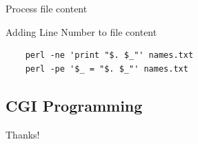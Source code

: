 \documentclass[UTF8]{beamer}
\begin{document}
\begin{frame}[fragile]{Process file content}
\begin{block}{Adding Line Number to file content}
  \begin{verbatim}
    perl -ne 'print "$. $_"' names.txt
    perl -pe '$_ = "$. $_"' names.txt
  \end{verbatim}
\end{block}
\end{frame}

\subsection{CGI Programming}

\begin{frame}
  \centerline{\Huge{Thanks!}}
\end{frame}
\end{document}
